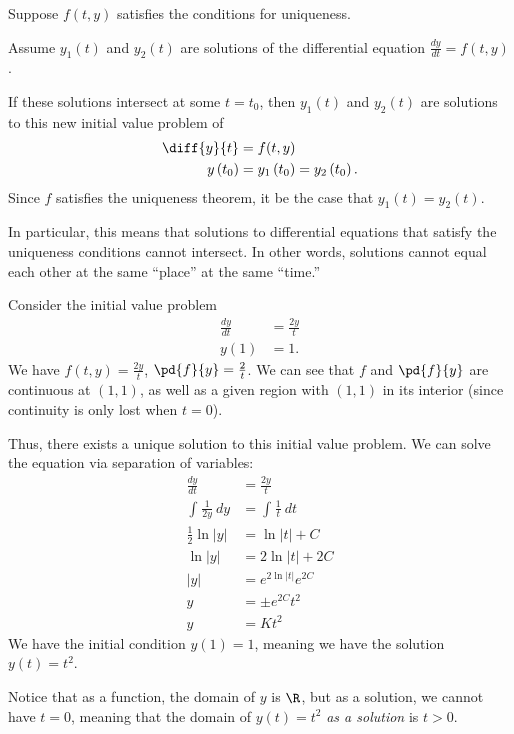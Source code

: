 \documentclass[10pt]{mypackage}
\begin{document}
\begin{example}
  Suppose $f(t,y)$ satisfies the conditions for uniqueness.\newline

  Assume $y_1(t)$ and $y_2(t)$ are solutions of the differential equation $\frac{dy}{dt} = f(t,y)$.\newline

  If these solutions intersect at some $t = t_0$, then $y_1(t)$ and $y_2(t)$ are solutions to this new initial value problem of
  \begin{align*}
    \diff{y}{t} &= f(t,y)\\
    y\left(t_0\right) &= y_1\left(t_0\right) = y_2\left(t_0\right).
  \end{align*}
  Since $f$ satisfies the uniqueness theorem, it be the case that $y_1(t) = y_2(t)$.\newline

  In particular, this means that solutions to differential equations that satisfy the uniqueness conditions cannot intersect. In other words, solutions cannot equal each other at the same ``place'' at the same ``time.''
\end{example}
\begin{example}
  Consider the initial value problem
  \begin{align*}
    \frac{dy}{dt} &= \frac{2y}{t}\\
    y(1) &= 1.
  \end{align*}
  We have $f(t,y) = \frac{2y}{t}$, $\pd{f}{y} = \frac{2}{t}$. We can see that $f$ and $\pd{f}{y}$ are continuous at $(1,1)$, as well as a given region with $(1,1)$ in its interior (since continuity is only lost when $t = 0$).\newline

  Thus, there exists a unique solution to this initial value problem. We can solve the equation via separation of variables:
  \begin{align*}
    \frac{dy}{dt} &= \frac{2y}{t}\\
    \int_{}^{} \frac{1}{2y}\:dy &= \int_{}^{} \frac{1}{t}\:dt\\
    \frac{1}{2}\ln|y| &= \ln|t| + C\\
    \ln|y| &= 2\ln|t| + 2C\\
    |y| &= e^{2\ln|t|}e^{2C}\\
    y &= \pm e^{2C}t^2\\
    y &= Kt^2
  \end{align*}
  We have the initial condition $y(1) = 1$, meaning we have the solution $y(t) = t^2$.\newline

  Notice that as a function, the domain of $y$ is $\R$, but as a solution, we cannot have $t = 0$, meaning that the domain of $y(t) = t^2$ \textit{as a solution} is $t > 0$.
\end{example}
\end{document}
